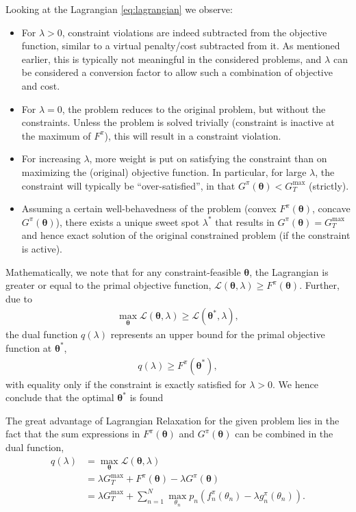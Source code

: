 \documentclass{article}
\begin{document}
Looking at the Lagrangian \eqref{eq:lagrangian} we observe:
\begin{itemize}
    \item For $\lambda > 0$, constraint violations are indeed subtracted from the objective function, similar to a virtual penalty/cost subtracted from it. As mentioned earlier, this is typically not meaningful in the considered problems, and $\lambda$ can be considered a conversion factor to allow such a combination of objective and cost.
    \item For $\lambda = 0$, the problem reduces to the original problem, but without the constraints. Unless the problem is solved trivially (constraint is inactive at the maximum of $F^\pi$), this will result in a constraint violation.  
    \item For increasing $\lambda$, more weight is put on satisfying the constraint than on maximizing the (original) objective function. In particular, for large $\lambda$, the constraint will typically be ``over-satisfied'', in that $G^\pi(\boldsymbol{\theta})< G^\text{max}_T$ (strictly).
    \item Assuming a certain well-behavedness of the problem (convex $F^\pi(\boldsymbol{\theta})$, concave $G^\pi(\boldsymbol{\theta})$), there exists a unique sweet spot $\lambda^*$ that results in $G^\pi(\boldsymbol{\theta}) = G^\text{max}_T$ and hence exact solution of the original constrained problem (if the constraint is active).
\end{itemize}

Mathematically, we note that for any constraint-feasible $\boldsymbol{\theta}$, the Lagrangian is greater or equal to the primal objective function, $\mathcal{L}(\boldsymbol{\theta}, \lambda) \ge F^\pi(\boldsymbol{\theta})$. Further, due to 
\begin{align}
    \max_{\boldsymbol{\theta}} \mathcal{L}(\boldsymbol{\theta},\lambda) \ge \mathcal{L}(\boldsymbol{\theta^*},\lambda),
\end{align}
the dual function $q(\lambda)$ represents an upper bound for the primal objective function at $\boldsymbol{\theta^*}$,
\begin{align}
    q(\lambda) \ge F^\pi(\boldsymbol{\theta^*}),
\end{align}
with equality only if the constraint is exactly satisfied for $\lambda > 0$. We hence conclude that the optimal $\boldsymbol{\theta^*}$ is found 


The great advantage of Lagrangian Relaxation for the given problem lies in the fact that the sum expressions in $F^\pi(\boldsymbol{\theta})$ and $G^\pi(\boldsymbol{\theta})$ can be combined in the dual function,
\begin{align}
    q(\lambda) &=\max_{\boldsymbol{\theta}}
    \mathcal{L}(\boldsymbol{\theta},\lambda)\\
    &=\lambda G_T^{\max} + F^\pi(\boldsymbol{\theta}) - \lambda G^\pi(\boldsymbol{\theta})\\
    &=\lambda G_T^{\max} + \sum_{n = 1}^N \max_{\theta_n} p_n \left( f^\pi_n(\theta_n) - \lambda g^\pi_n(\theta_n)\right).
\end{align}
\end{document}
